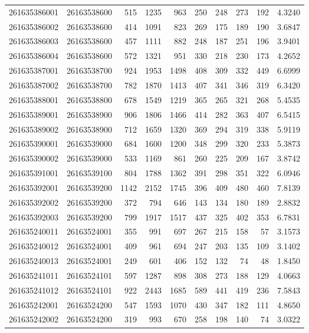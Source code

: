 \documentclass[
  11pt,
]{article}
\begin{document}
\begin{longtable}[t]{llrrrrrrrr}
261635386001 & 26163538600 & 515 & 1235 & 963 & 250 & 248 & 273 & 192 & 4.3240\\
261635386002 & 26163538600 & 414 & 1091 & 823 & 269 & 175 & 189 & 190 & 3.6847\\
261635386003 & 26163538600 & 457 & 1111 & 882 & 248 & 187 & 251 & 196 & 3.9401\\
261635386004 & 26163538600 & 572 & 1321 & 951 & 330 & 218 & 230 & 173 & 4.2652\\
261635387001 & 26163538700 & 924 & 1953 & 1498 & 408 & 309 & 332 & 449 & 6.6999\\
261635387002 & 26163538700 & 782 & 1870 & 1413 & 407 & 341 & 346 & 319 & 6.3420\\
261635388001 & 26163538800 & 678 & 1549 & 1219 & 365 & 265 & 321 & 268 & 5.4535\\
261635389001 & 26163538900 & 906 & 1806 & 1466 & 414 & 282 & 363 & 407 & 6.5415\\
261635389002 & 26163538900 & 712 & 1659 & 1320 & 369 & 294 & 319 & 338 & 5.9119\\
261635390001 & 26163539000 & 684 & 1600 & 1200 & 348 & 299 & 320 & 233 & 5.3873\\
261635390002 & 26163539000 & 533 & 1169 & 861 & 260 & 225 & 209 & 167 & 3.8742\\
261635391001 & 26163539100 & 804 & 1788 & 1362 & 391 & 298 & 351 & 322 & 6.0946\\
261635392001 & 26163539200 & 1142 & 2152 & 1745 & 396 & 409 & 480 & 460 & 7.8139\\
261635392002 & 26163539200 & 372 & 794 & 646 & 143 & 134 & 180 & 189 & 2.8832\\
261635392003 & 26163539200 & 799 & 1917 & 1517 & 437 & 325 & 402 & 353 & 6.7831\\
261635240011 & 26163524001 & 355 & 991 & 697 & 267 & 215 & 158 & 57 & 3.1573\\
261635240012 & 26163524001 & 409 & 961 & 694 & 247 & 203 & 135 & 109 & 3.1402\\
261635240013 & 26163524001 & 249 & 601 & 406 & 152 & 132 & 74 & 48 & 1.8450\\
261635241011 & 26163524101 & 597 & 1287 & 898 & 308 & 273 & 188 & 129 & 4.0663\\
261635241012 & 26163524101 & 922 & 2443 & 1685 & 589 & 441 & 419 & 236 & 7.5843\\
261635242001 & 26163524200 & 547 & 1593 & 1070 & 430 & 347 & 182 & 111 & 4.8650\\
261635242002 & 26163524200 & 319 & 993 & 670 & 258 & 198 & 140 & 74 & 3.0322\\

\end{longtable}
\end{document}
